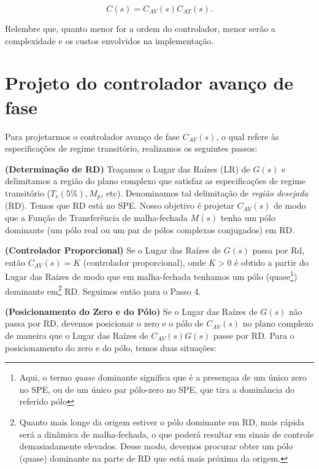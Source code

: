 \documentclass[
]{book}
\theoremstyle{definition}
\theoremstyle{definition}
\theoremstyle{definition}
\theoremstyle{remark}
\begin{document}
\[
C(s) = C_{AV}(s)C_{AT}(s).
\]

Relembre que, quanto menor for a ordem do controlador, menor serão a complexidade e os custos envolvidos na implementação.

\hypertarget{projeto-do-controlador-avanuxe7o-de-fase}{%
\section{Projeto do controlador avanço de fase}\label{projeto-do-controlador-avanuxe7o-de-fase}}

Para projetarmos o controlador avanço de fase \(C_{AV}(s)\), o qual refere às especificações de regime transitório, realizamos os seguintes passos:

\textbf{(Determinação de RD)} Traçamos o Lugar das Raízes (LR) de \(G(s)\) e delimitamos a região do plano complexo que satisfaz as especificações de regime transitório (\(T_s(5\%),M_p\), etc). Denominamos tal delimitação de \emph{região desejada} (RD). Temos que RD está no SPE. Nosso objetivo é projetar \(C_{AV}(s)\) de modo que a Função de Transferência de malha-fechada \(M(s)\) tenha um pólo dominante (um pólo real ou um par de pólos complexos conjugados) em RD.

\textbf{(Controlador Proporcional)} Se o Lugar das Raízes de \(G(s)\) passa por Rd, então \(C_{AV}(s) = K\) (controlador proporcional), onde \(K>0\) é obtido a partir do Lugar das Raízes de modo que em malha-fechada tenhamos um pólo (quase\footnote{Aqui, o termo \emph{quase} dominante significa que é a presençaa de um único zero no SPE, ou de um único par pólo-zero no SPE, que tira a dominância do referido pólo}) dominante em\footnote{Quanto mais longe da origem estiver o pólo dominante em RD, mais rápida será a dinâmica de malha-fechada, o que poderá resultar em sinais de controle demasiadamente elevados. Desse modo, devemos procurar obter um pólo (quase) dominante na parte de RD que está mais próxima da origem.} RD. Seguimos então para o Passo 4.

\textbf{(Posicionamento do Zero e do Pólo)} Se o Lugar das Raízes de \(G(s)\) não passa por RD, devemos posicionar o zero e o pólo de \(C_{AV}(s)\) no plano complexo de maneira que o Lugar das Raízes de \(C_{AV}(s)G(s)\) passe por RD. Para o posicionamento do zero e do pólo, temos duas situações:
\end{document}
